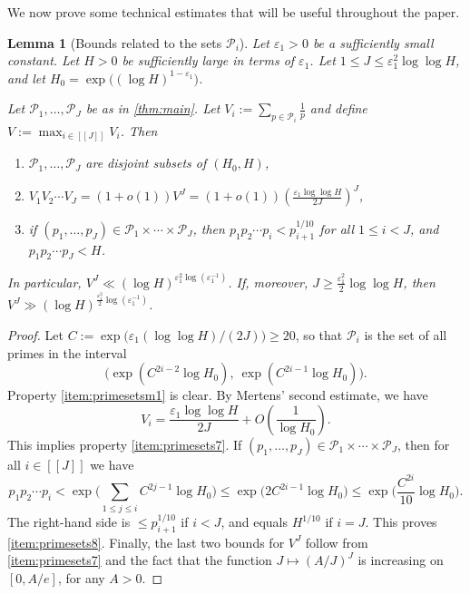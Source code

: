 \documentclass[11pt]{amsart}
\newtheorem{lemma}[theorem]{Lemma}
\theoremstyle{definition}
\renewcommand{\leq}{\leqslant}
\renewcommand{\geq}{\geqslant}
\newcommand{\sinterval}[1]{[\![#1]\!] }
\newcommand{\eps}{\varepsilon}
\newcommand{\primes}{\mathcal{P}}
\newcommand{\cstH}{\eps_1}
\newcommand{\curlyL}{V}
\newcommand{\repR}{J}
\newcommand{\newR}{\sinterval{J}}
\begin{document}
We now prove some technical estimates that will be useful throughout the paper.

\begin{lemma}[Bounds related to the sets $\primes_i$]
\label{lem:primesets}
Let $\cstH>0$ be a sufficiently small constant. Let $H>0$ be sufficiently large in terms of $\cstH$. Let $1\leq \repR \leq \cstH^2 \log \log H$, and let $H_0 = \exp \big((\log H)^{1-\cstH}\big)$.

Let $\primes_1, \ldots, \primes_{\repR}$ be as in \cref{thm:main}. Let $\curlyL_i := \sum_{p\in \primes_i} \frac 1p$ and define $\curlyL := \max_{i\in \newR} \curlyL_i$. Then 
\begin{enumerate}[label=(\alph*), ref=\alph*]
	\item \label{item:primesetsm1} $\primes_1, \ldots, \primes_{\repR}$ are disjoint subsets of $(H_0, H)$,
	\item \label{item:primesets7} $\curlyL_1\curlyL_2\cdots \curlyL_{\repR} = (1+o(1))\curlyL^{\repR} = (1+o(1)) \left(\displaystyle\frac{\cstH \log \log H}{2\repR}\right)^{\repR}$,
	\item \label{item:primesets8} if $(p_1, \ldots, p_{\repR}) \in \primes_1\times \cdots \times \primes_{\repR}$, then $p_1p_2\cdots p_i < p_{i+1}^{1/10}$ for all $1\leq i <\repR$, and $p_1p_2\cdots p_{\repR}<H$.
\end{enumerate}
In particular, $\curlyL^{\repR} \ll (\log H)^{\cstH^2 \log (\eps_1^{-1})}$. If, moreover, $\repR \geq \frac{\cstH^2}{2} \log \log H$, then $\curlyL^{\repR} \gg (\log H)^{\frac{\cstH^2}{2} \log (\eps_1^{-1})}$.
\end{lemma}
\begin{proof}
Let $C := \exp\big(\cstH (\log \log H)/(2\repR)\big) \geq 20$, so that $\primes_i$ is the set of all primes in the interval
\begin{equation*}
\Big(\exp \left(C^{2i-2} \log H_0\right),\  \exp \left(C^{2i-1} \log H_0\right) \Big).
\end{equation*}
Property \cref{item:primesetsm1} is clear. By Mertens' second estimate, we have 
\begin{equation}
\label{eq:approxLi}
\curlyL_i = \frac{\cstH \log \log H}{2\repR} + O\left(\frac{1}{\log H_0}\right). 
\end{equation}
This implies property \cref{item:primesets7}. If $(p_1, \ldots, p_{\repR}) \in \primes_1\times \cdots \times \primes_{\repR}$, then for all $i\in \newR$ we have 
\begin{equation*}
p_1p_2\cdots p_i < \exp \Bigg(\sum_{1\leq j\leq i} C^{2j-1} \log H_0\Bigg) \leq \exp \Big( 2C^{2i-1} \log H_0\Big) \leq \exp \bigg( \frac{C^{2i}}{10} \log H_0\bigg).
\end{equation*}
The right-hand side is $\leq p_{i+1}^{1/10}$ if $i<\repR$, and equals $H^{1/10}$ if $i=\repR$. This proves \cref{item:primesets8}.
Finally, the last two bounds for $\curlyL^J$ follow from \cref{item:primesets7} and the fact that the function $J\mapsto (A/J)^J$ is increasing on $[0, A/e]$, for any $A>0$. 
\end{proof}
\end{document}
